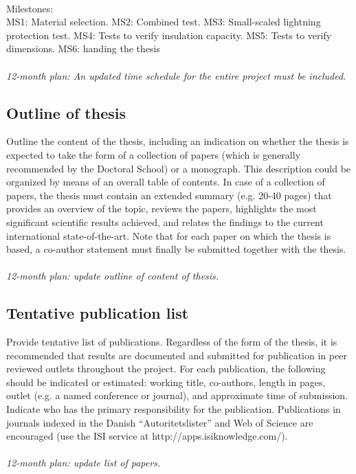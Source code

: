 \vspace{0.3cm}
\\
\normalsize
Milestones:
\\
{\small MS1: Material selection. MS2: Combined test.  MS3: Small-scaled lightning protection test. MS4: Tests to verify insulation capacity. MS5: Tests to verify dimensions. MS6: handing the thesis}
\\
\\
\textit{12-month plan: An updated time schedule for the entire project must be included.}

\subsection{Outline of thesis}
Outline the content of the thesis, including an indication on whether the thesis is expected to take the form of a collection of papers (which is generally recommended by the Doctoral School) or a monograph. This description could be organized by means of an overall table of contents. In case of a collection of papers, the thesis must contain an extended summary (e.g. 20-40 pages) that provides an overview of the topic, reviews the papers, highlights the most significant scientific results achieved, and relates the findings to the current international state-of-the-art. Note that for each paper on which the thesis is based, a co-author statement must finally be submitted together with the thesis.
\\
\\ 
\textit{12-month plan: update outline of content of thesis.}

\subsection{Tentative publication list}
Provide tentative list of publications. Regardless of the form of the thesis, it is recommended that results are documented and submitted for publication in peer reviewed outlets throughout the project. For each publication, the following should be indicated or estimated: working title, co-authors, length in pages, outlet (e.g. a named conference or journal), and approximate time of submission. Indicate who has the primary responsibility for the publication. Publications in journals indexed in the Danish “Autoritetslister” and Web of Science are encouraged (use the ISI service at http://apps.isiknowledge.com/).
\\
\\
\textit{12-month plan: update list of papers.}

